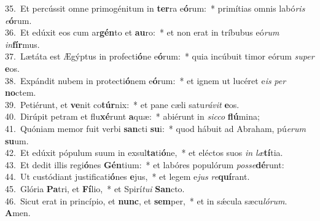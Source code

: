 {35.~}Et percússit omne primogénitum in \textbf{ter}ra e\textbf{ó}rum:~* primítias omnis labó\textit{ris} \textit{e}\textbf{ó}rum.\\
{36.~}Et edúxit eos cum ar\textbf{gén}to et \textbf{au}ro:~* et non erat in tríbubus eó\textit{rum} \textit{in}\textbf{fír}mus.\\
{37.~}Lætáta est Ægýptus in profecti\textbf{ó}ne e\textbf{ó}rum:~* quia incúbuit timor eórum \textit{su}\textit{per} \textbf{e}os.\\
{38.~}Expándit nubem in protecti\textbf{ó}nem e\textbf{ó}rum:~* et ignem ut lucéret e\textit{is} \textit{per} \textbf{no}ctem.\\
{39.~}Petiérunt, et \textbf{ve}nit co\textbf{túr}nix:~* et pane cæli satu\textit{rá}\textit{vit} \textbf{e}os.\\
{40.~}Dirúpit petram et flu\textbf{xé}runt \textbf{a}quæ:~* abiérunt in \textit{sic}\textit{co} \textbf{flú}mina;\\
{41.~}Quóniam memor fuit verbi \textbf{san}cti \textbf{su}i:~* quod hábuit ad Abraham, pú\textit{e}\textit{rum} \textbf{su}um.\\
{42.~}Et edúxit pópulum suum in exsul\textbf{ta}ti\textbf{ó}ne,~* et eléctos suos \textit{in} \textit{læ}\textbf{tí}tia.\\
{43.~}Et dedit illis regi\textbf{ó}nes \textbf{Gén}tium:~* et labóres populórum \textit{pos}\textit{se}\textbf{dé}runt:\\
{44.~}Ut custódiant justificati\textbf{ó}nes \textbf{e}jus,~* et legem e\textit{jus} \textit{re}\textbf{quí}rant.\\
{45.~}Glória \textbf{Pa}tri, et \textbf{Fí}lio,~* et Spirí\textit{tu}\textit{i} \textbf{San}cto.\\
{46.~}Sicut erat in princípio, et \textbf{nunc}, et \textbf{sem}per,~* et in sǽcula sæcu\textit{ló}\textit{rum}. \textbf{A}men.\\
